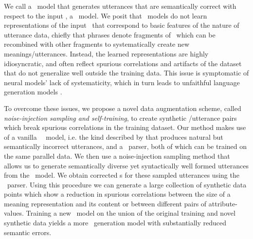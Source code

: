 We call a \naturallanguagegeneration~model that generates utterances that are
semantically correct with respect to the input \meaningrepresentation, a
\faithfulgeneration~model.  We posit that \sequencetosequence~models do not
learn representations of the input \meaningrepresentation~that correspond to
basic features of the nature of utterance data, chiefly that phrases denote
fragments of \meaningrepresentation~which can be recombined with other
fragments to systematically create new meanings/utterances. Instead, the
learned representations are highly idiosyncratic, and often reflect spurious
correlations and artifacts of the dataset that do not generalize well outside
the training data.  This issue is symptomatic of neural models' lack of
systematicity, which in turn  leads to unfaithful language generation models
\citep{lake18}.

To overcome these issues, we propose a novel data augmentation scheme, called
\textit{noise-injection sampling and self-training}, to create synthetic
\meaningrepresentation/utterance pairs which break spurious correlations in the
training dataset.
Our method makes use of a vanilla
\sequencetosequence~\naturallanguagegeneration~model, i.e. the kind described
by \citet{dusek2020} that produces natural but semantically incorrect
utterances, and a \meaningrepresentation~parser, both of which can be trained
on the same parallel data.  We then use a noise-injection sampling method
\citep{cho2016} that allows us to generate semantically diverse yet
syntactically well formed utterances from the \naturallanguagegeneration~model.
We obtain corrected \meaningrepresentation s for these sampled utterances using
the \meaningrepresentation~parser.  Using this procedure we can generate a
large collection of synthetic data points which show a reduction in spurious
correlations between the size of a meaning representation and its content or
between different pairs of attribute-values. Training a new
\sequencetosequence~model on the union of the original training and novel
synthetic data yields a more \faithful~generation model with substantially
reduced semantic errors.



